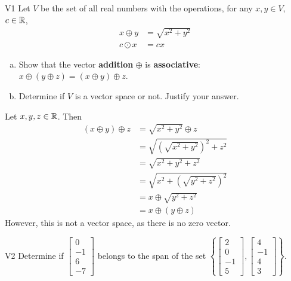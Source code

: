 \documentclass{sbgLAexam}
\begin{document}
\begin{extract}\newpage\end{extract}
\begin{problem}{V1}
Let $V$ be the set of all real numbers with the operations, for any $x, y \in V$, $c \in \mathbb{R}$,
\begin{align*}
x \oplus y &= \sqrt{x^2+y^2} \\
c \odot x &= c x
\end{align*}
\begin{enumerate}[(a)]
\item Show that the vector \textbf{addition} $\oplus$ is \textbf{associative}:
      \(x \oplus (y \oplus z)=(x\oplus y)\oplus z\).
\item Determine if $V$ is a vector space or not.  Justify your answer.
\end{enumerate}
\end{problem}
\begin{solution}
Let $x,y,z \in \mathbb{R}$.  Then
\begin{align*}
(x\oplus y) \oplus z &= \sqrt{x^2+y^2} \oplus z \\&= \sqrt{ (\sqrt{x^2+y^2})^2+z^2} \\&= \sqrt{x^2+y^2+z^2} \\
&= \sqrt{x^2+(\sqrt{y^2+z^2})^2} \\ &= x \oplus \sqrt{y^2+z^2} \\ &= x \oplus (y \oplus z)
\end{align*}
However, this is not a vector space, as there is no zero vector.
\end{solution}
\begin{problem}{V2}
  Determine if
  \(\begin{bmatrix} 0 \\ -1 \\ 6 \\ -7 \end{bmatrix}\)
  belongs to the span of the set
  \(\left\{
    \begin{bmatrix} 2 \\ 0 \\ -1 \\ 5 \end{bmatrix},
    \begin{bmatrix} 4 \\ -1 \\ 4 \\ 3 \end{bmatrix}
    \right\}
  \).
\end{problem}
\end{document}
